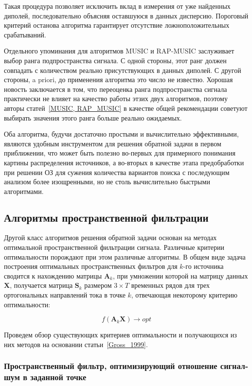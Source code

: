 Такая процедура позволяет исключить вклад в измерения от уже найденных
диполей, последовательно объясняя оставшуюся в данных дисперсию.
Пороговый критерий останова алгоритма гарантирует отсутствие ложноположительных
срабатываний.

Отдельного упоминания для алгоритмов MUSIC и RAP-MUSIC заслуживает выбор
ранга подпространства сигнала. С одной стороны, этот ранг должен совпадать
с количеством реально присутствующих в данных диполей. С другой стороны,
a priori, до применения алгоритма это число не известно. Хорошая новость заключается
в том, что переоценка ранга подпространства сигнала практически не влияет на
качество работы этзих двух алгоритмов,
поэтому авторы статей~\ref{MUSIC, RAP_MUSIC} в качестве общей рекомендации
советуют выбирать значения этого ранга больше реально ожидаемых.

Оба алгоритма, будучи достаточно простыми и вычислительно эффективными,
являются удобным инструментом для решения обратной задачи в первом приближении,
что может быть полезно во-первых для примерного понимания картины распределения
источников, а во-вторых в качестве этапа предобработки при решении ОЗ
для сужения количества вариантов поиска с последующим анализом более
изощренными, но не столь вычислительно быстрыми алгоритмами.

\subsection{Алгоритмы пространственной фильтрации}

Другой класс алгоритмов решения обратной задачи основан на методах оптимальной пространственной
фильтрации сигнала. Различные критерии оптимальности порождают при этом различные алгоритмы.
В общем виде задача построения оптимальных пространственных фильтров для $k$-го источника
сводится к нахождению
матрицы $\mathbf{A}_k$, при умножении которой на матрицу данных $\mathbf{X}$, получается
матрица $\mathbf{S}_k$ размером $3\times T$ временных рядов для трех ортогональных
направлений тока в точке $k$, отвечающая некоторому критерию оптимальности:

\begin{equation}
    f(\mathbf{A}_k \mathbf{X}) \rightarrow opt
\end{equation}

Проведем обзор существующих критериев оптимальности и получающихся из них методов на
основании статьи~\ref{Gross_1999}.

\subsubsection{Пространственный фильтр, оптимизирующий отношение сигнал-шум в заданной точке}


